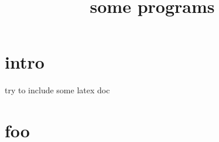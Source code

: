 \documentclass[a4paper]{report}
\begin{document}

\title{some programs}

\maketitle
\tableofcontents

\chapter{intro}
try to include some latex doc

\chapter{foo}

\end{document}
